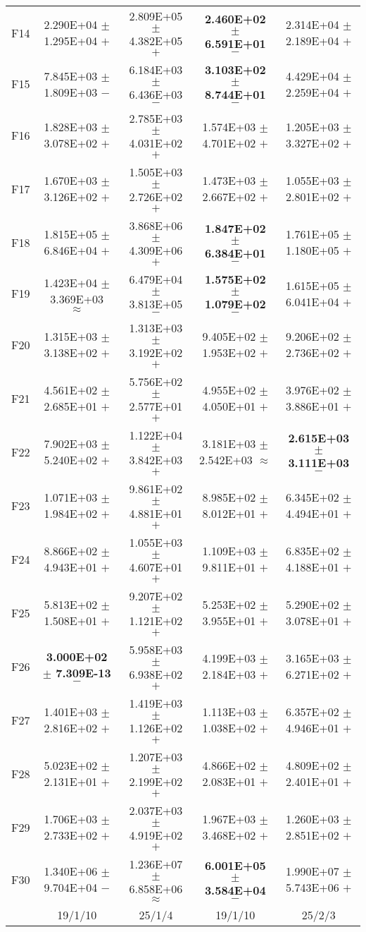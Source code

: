 \documentclass[paper]{ieice}
\begin{document}
\begin{table*}[htbp]
\begin{tabular}{c|c|c|c|c}
		F14	&	2.290E+04	$\pm$	1.295E+04	$+$	&	2.809E+05	$\pm$	4.382E+05	$+$	&	\textbf{2.460E+02	$\pm$	6.591E+01}	$-$	&	2.314E+04	$\pm$	2.189E+04	$+$	\\
		F15	&	7.845E+03	$\pm$	1.809E+03	$-$	&	6.184E+03	$\pm$	6.436E+03	$-$	&	\textbf{3.103E+02	$\pm$	8.744E+01}	$-$	&	4.429E+04	$\pm$	2.259E+04	$+$	\\
		F16	&	1.828E+03	$\pm$	3.078E+02	$+$	&	2.785E+03	$\pm$	4.031E+02	$+$	&	1.574E+03	$\pm$	4.701E+02	$+$	&	1.205E+03	$\pm$	3.327E+02	$+$	\\
		F17	&	1.670E+03	$\pm$	3.126E+02	$+$	&	1.505E+03	$\pm$	2.726E+02	$+$	&	1.473E+03	$\pm$	2.667E+02	$+$	&	1.055E+03	$\pm$	2.801E+02	$+$	\\
		F18	&	1.815E+05	$\pm$	6.846E+04	$+$	&	3.868E+06	$\pm$	4.309E+06	$+$	&	\textbf{1.847E+02	$\pm$	6.384E+01}	$-$	&	1.761E+05	$\pm$	1.180E+05	$+$	\\
		F19	&	1.423E+04	$\pm$	3.369E+03	$\approx$	&	6.479E+04	$\pm$	3.813E+05	$-$	&	\textbf{1.575E+02	$\pm$	1.079E+02}	$-$	&	1.615E+05	$\pm$	6.041E+04	$+$	\\
		F20	&	1.315E+03	$\pm$	3.138E+02	$+$	&	1.313E+03	$\pm$	3.192E+02	$+$	&	9.405E+02	$\pm$	1.953E+02	$+$	&	9.206E+02	$\pm$	2.736E+02	$+$	\\
		F21	&	4.561E+02	$\pm$	2.685E+01	$+$	&	5.756E+02	$\pm$	2.577E+01	$+$	&	4.955E+02	$\pm$	4.050E+01	$+$	&	3.976E+02	$\pm$	3.886E+01	$+$	\\
		F22	&	7.902E+03	$\pm$	5.240E+02	$+$	&	1.122E+04	$\pm$	3.842E+03	$+$	&	3.181E+03	$\pm$	2.542E+03	$\approx$	&	\textbf{2.615E+03	$\pm$	3.111E+03}	$-$	\\
		F23	&	1.071E+03	$\pm$	1.984E+02	$+$	&	9.861E+02	$\pm$	4.881E+01	$+$	&	8.985E+02	$\pm$	8.012E+01	$+$	&	6.345E+02	$\pm$	4.494E+01	$+$	\\
		F24	&	8.866E+02	$\pm$	4.943E+01	$+$	&	1.055E+03	$\pm$	4.607E+01	$+$	&	1.109E+03	$\pm$	9.811E+01	$+$	&	6.835E+02	$\pm$	4.188E+01	$+$	\\
		F25	&	5.813E+02	$\pm$	1.508E+01	$+$	&	9.207E+02	$\pm$	1.121E+02	$+$	&	5.253E+02	$\pm$	3.955E+01	$+$	&	5.290E+02	$\pm$	3.078E+01	$+$	\\
		F26	&	\textbf{3.000E+02	$\pm$	7.309E-13}	$-$	&	5.958E+03	$\pm$	6.938E+02	$+$	&	4.199E+03	$\pm$	2.184E+03	$+$	&	3.165E+03	$\pm$	6.271E+02	$+$	\\
		F27	&	1.401E+03	$\pm$	2.816E+02	$+$	&	1.419E+03	$\pm$	1.126E+02	$+$	&	1.113E+03	$\pm$	1.038E+02	$+$	&	6.357E+02	$\pm$	4.946E+01	$+$	\\
		F28	&	5.023E+02	$\pm$	2.131E+01	$+$	&	1.207E+03	$\pm$	2.199E+02	$+$	&	4.866E+02	$\pm$	2.083E+01	$+$	&	4.809E+02	$\pm$	2.401E+01	$+$	\\
		F29	&	1.706E+03	$\pm$	2.733E+02	$+$	&	2.037E+03	$\pm$	4.919E+02	$+$	&	1.967E+03	$\pm$	3.468E+02	$+$	&	1.260E+03	$\pm$	2.851E+02	$+$	\\
		F30	&	1.340E+06	$\pm$	9.704E+04	$-$	&	1.236E+07	$\pm$	6.858E+06	$\approx$	&	\textbf{6.001E+05	$\pm$	3.584E+04}	$-$	&	1.990E+07	$\pm$	5.743E+06	$+$	\\  \hline
		&	19/1/10				&	25/1/4				&	19/1/10				&	25/2/3				\\ \hline   
	\end{tabular}
\end{table*}
\end{document}
